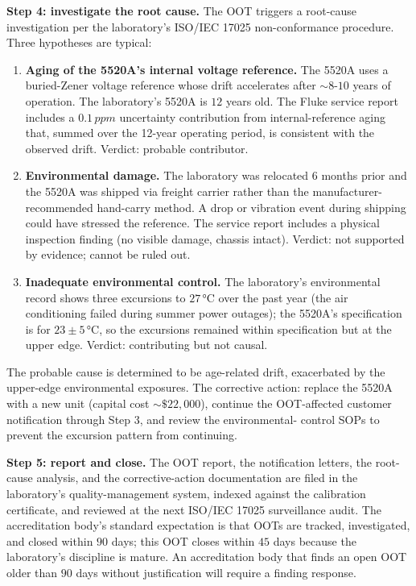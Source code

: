 \textbf{Step 4: investigate the root cause.} The OOT triggers a
root-cause investigation per the laboratory's ISO/IEC 17025
non-conformance procedure. Three hypotheses are typical:
\begin{enumerate}[leftmargin=*]
  \item \textbf{Aging of the 5520A's internal voltage reference.}
    The 5520A uses a buried-Zener voltage reference whose drift
    accelerates after $\sim 8$-$10$ years of operation. The
    laboratory's 5520A is $12$ years old. The Fluke service
    report includes a $0.1\,\si{ppm}$ uncertainty contribution
    from internal-reference aging that, summed over the 12-year
    operating period, is consistent with the observed drift.
    Verdict: probable contributor.
  \item \textbf{Environmental damage.} The laboratory was
    relocated $6$ months prior and the 5520A was shipped via
    freight carrier rather than the manufacturer-recommended
    hand-carry method. A drop or vibration event during shipping
    could have stressed the reference. The service report
    includes a physical inspection finding (no visible damage,
    chassis intact). Verdict: not supported by evidence; cannot
    be ruled out.
  \item \textbf{Inadequate environmental control.} The
    laboratory's environmental record shows three excursions to
    $27\,\si{\degreeCelsius}$ over the past year (the air
    conditioning failed during summer power outages); the
    5520A's specification is for $23 \pm 5\,\si{\degreeCelsius}$,
    so the excursions remained within specification but at the
    upper edge. Verdict: contributing but not causal.
\end{enumerate}
The probable cause is determined to be age-related drift,
exacerbated by the upper-edge environmental exposures. The
corrective action: replace the 5520A with a new unit (capital
cost $\sim\$22{,}000$), continue the OOT-affected customer
notification through Step 3, and review the environmental-
control SOPs to prevent the excursion pattern from continuing.

\textbf{Step 5: report and close.} The OOT report, the
notification letters, the root-cause analysis, and the
corrective-action documentation are filed in the laboratory's
quality-management system, indexed against the calibration
certificate, and reviewed at the next ISO/IEC 17025 surveillance
audit. The accreditation body's standard expectation is that
OOTs are tracked, investigated, and closed within $90$ days;
this OOT closes within $45$ days because the laboratory's
discipline is mature. An accreditation body that finds an open
OOT older than $90$ days without justification will require a
finding response.

